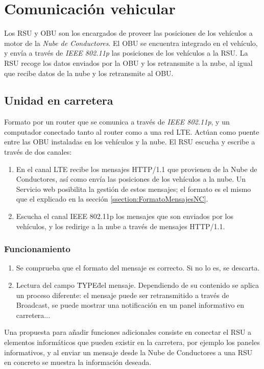 \section{Comunicación vehicular}
Los RSU y OBU son los encargados de proveer las posiciones de los vehículos a motor de la \emph{Nube de Conductores}. El OBU se encuentra integrado en el vehículo, y envía a través de \emph{IEEE 802.11p} las posiciones de los vehículos a la RSU. La RSU recoge los datos enviados por la OBU y los retransmite a la nube, al igual que recibe datos de la nube y los retransmite al OBU.

	\subsection{Unidad en carretera}
	Formato por un router que se comunica a través de \emph{IEEE 802.11p}, y un computador conectado tanto al router como a una red LTE. Actúan como puente entre las OBU instaladas en los vehículos y la nube. El RSU escucha y escribe a través de dos canales:
	
	\begin{enumerate}
		\item En el canal LTE recibe los mensajes HTTP/1.1 que provienen de la Nube de Conductores, así como envía las posiciones de los vehículos a la nube. Un Servicio web posibilita la gestión de estos mensajes; el formato es el mismo que el explicado en la sección \ref{ssection:FormatoMensajesNC}.
		
		\item Escucha el canal IEEE 802.11p los mensajes que son enviados por los vehículos, y los redirige a la nube a través de mensajes HTTP/1.1.
	\end{enumerate}
		\subsubsection{Funcionamiento}
		\begin{enumerate}
			\item Se comprueba que el formato del mensaje es correcto. Si no lo es, se descarta.
			\item Lectura del campo \"TYPE\" del mensaje. Dependiendo de su contenido se aplica un proceso diferente: el mensaje puede ser retransmitido a través de Broadcast, se puede mostrar una notificación en un panel informativo en carretera...
		\end{enumerate}
		
		Una propuesta para añadir funciones adicionales consiste en conectar el RSU a elementos informáticos que pueden existir en la carretera, por ejemplo los paneles informativos, y al enviar un mensaje desde la Nube de Conductores a una RSU en concreto se muestra la información deseada.

